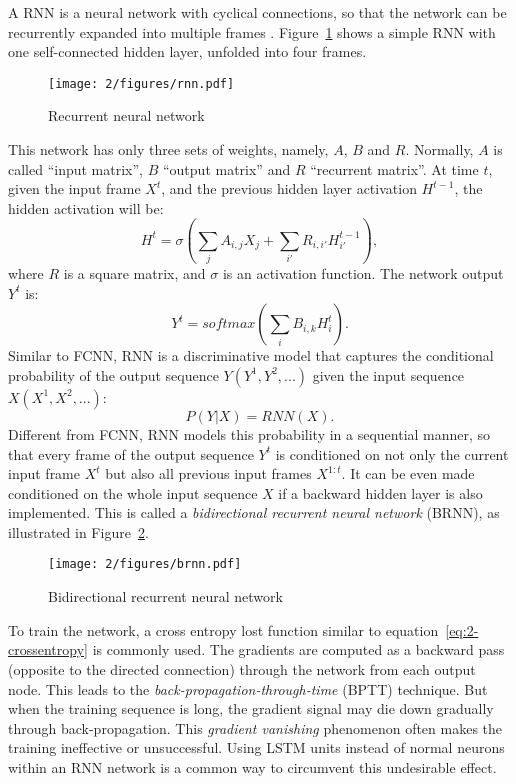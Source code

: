 A RNN is a neural network with cyclical connections, so that the network can be recurrently expanded into multiple frames \cite{elman1990finding,jordan1986attractor,lang1990time}. Figure~\ref{fig:2-rnn} shows a simple RNN with one self-connected hidden layer, unfolded into four frames.
\begin{figure}[htb]
\centering
\texttt{[image: 2/figures/rnn.pdf]}
\caption{Recurrent neural network}
\label{fig:2-rnn}
\end{figure}
This network has only three sets of weights, namely, $A$, $B$ and $R$. Normally, $A$ is called ``input matrix'', $B$ ``output matrix'' and $R$ ``recurrent matrix''. At time $t$, given the input frame $X^t$, and the previous hidden layer activation $H^{t-1}$, the hidden activation will be:
\begin{equation}
H^t = \sigma(\sum_j A_{i,j}X_j + \sum_{i'} R_{i,i'}H^{t-1}_{i'}),
\end{equation}
where $R$ is a square matrix, and $\sigma$ is an activation function. The network output $Y^t$ is:
\begin{equation}
Y^t = softmax(\sum_i B_{i,k}H^t_i).
\end{equation}
Similar to FCNN, RNN is a discriminative model that captures the conditional probability of the output sequence $Y (Y^1,Y^2,...)$ given the input sequence $X (X^1, X^2,...)$:
\begin{equation}
P(Y|X) = RNN(X).
\end{equation}
Different from FCNN, RNN models this probability in a sequential manner, so that every frame of the output sequence $Y^t$ is conditioned on not only the current input frame $X^t$ but also all previous input frames $X^{1:t}$. It can be even made conditioned on the whole input sequence $X$ if a backward hidden layer is also implemented. This is called a {\it bidirectional recurrent neural network} (BRNN), as illustrated in Figure~\ref{fig:2-brnn}.
\begin{figure}[htb]
\centering
\texttt{[image: 2/figures/brnn.pdf]}
\caption{Bidirectional recurrent neural network}
\label{fig:2-brnn}
\end{figure}

To train the network, a cross entropy lost function similar to equation~\ref{eq:2-crossentropy} is commonly used. The gradients are computed as a backward pass (opposite to the directed connection) through the network from each output node. This leads to the {\it back-propagation-through-time} (BPTT) \cite{rumelhart1988parallel,werbos1990backpropagation} technique. But when the training sequence is long, the gradient signal may die down gradually through back-propagation. This {\it gradient vanishing} \cite{bengio2009learning} phenomenon often makes the training ineffective or unsuccessful. Using LSTM units instead of normal neurons within an RNN network is a common way to circumvent this undesirable effect.

